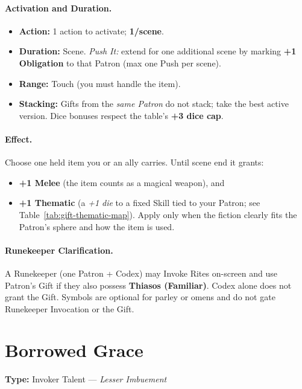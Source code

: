 \paragraph{Activation and Duration.}
\begin{itemize}
  \item \textbf{Action:} 1 action to activate; \textbf{1/scene}.
  \item \textbf{Duration:} Scene. \emph{Push It:} extend for one additional scene by marking \textbf{+1 Obligation} to that Patron (max one Push per scene).
  \item \textbf{Range:} Touch (you must handle the item).
  \item \textbf{Stacking:} Gifts from the \emph{same Patron} do not stack; take the best active version. Dice bonuses respect the table's \textbf{+3 dice cap}.
\end{itemize}

\paragraph{Effect.}
Choose one held item you or an ally carries. Until scene end it grants:
\begin{itemize}
  \item \textbf{+1 Melee} (the item counts as a magical weapon), and
  \item \textbf{+1 Thematic} (a \emph{+1 die} to a fixed Skill tied to your Patron; see Table~\ref{tab:gift-thematic-map}). Apply only when the fiction clearly fits the Patron's sphere and how the item is used.
\end{itemize}

\paragraph{Runekeeper Clarification.}
A Runekeeper (one Patron + Codex) may Invoke Rites on-screen and use Patron's Gift if they also possess \textbf{Thiasos (Familiar)}. Codex alone does not grant the Gift. Symbols are optional for parley or omens and do not gate Runekeeper Invocation or the Gift.

\section*{Borrowed Grace}
\label{talent:borrowed-grace}

\textbf{Type:} Invoker Talent — \textit{Lesser Imbuement}

